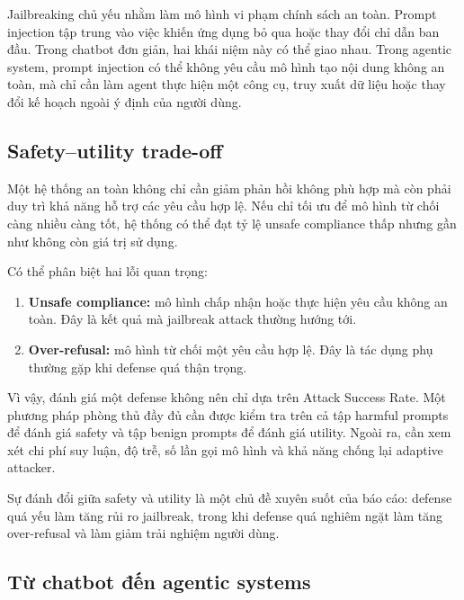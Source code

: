Jailbreaking chủ yếu nhằm làm mô hình vi phạm chính sách an toàn. Prompt
injection tập trung vào việc khiến ứng dụng bỏ qua hoặc thay đổi chỉ dẫn
ban đầu. Trong chatbot đơn giản, hai khái niệm này có thể giao nhau. Trong
agentic system, prompt injection có thể không yêu cầu mô hình tạo nội dung
không an toàn, mà chỉ cần làm agent thực hiện một công cụ, truy xuất dữ
liệu hoặc thay đổi kế hoạch ngoài ý định của người dùng.

\subsection{Safety--utility trade-off}
\label{subsec:safety-utility-tradeoff}

Một hệ thống an toàn không chỉ cần giảm phản hồi không phù hợp mà còn phải
duy trì khả năng hỗ trợ các yêu cầu hợp lệ. Nếu chỉ tối ưu để mô hình từ
chối càng nhiều càng tốt, hệ thống có thể đạt tỷ lệ unsafe compliance thấp
nhưng gần như không còn giá trị sử dụng.

Có thể phân biệt hai lỗi quan trọng:

\begin{enumerate}[leftmargin=1.2cm]
    \item \textbf{Unsafe compliance:}
    mô hình chấp nhận hoặc thực hiện yêu cầu không an toàn. Đây là kết quả
    mà jailbreak attack thường hướng tới.

    \item \textbf{Over-refusal:}
    mô hình từ chối một yêu cầu hợp lệ. Đây là tác dụng phụ thường gặp khi
    defense quá thận trọng.
\end{enumerate}

Vì vậy, đánh giá một defense không nên chỉ dựa trên Attack Success Rate.
Một phương pháp phòng thủ đầy đủ cần được kiểm tra trên cả tập harmful
prompts để đánh giá safety và tập benign prompts để đánh giá utility. Ngoài
ra, cần xem xét chi phí suy luận, độ trễ, số lần gọi mô hình và khả năng
chống lại adaptive attacker.

Sự đánh đổi giữa safety và utility là một chủ đề xuyên suốt của báo cáo:
defense quá yếu làm tăng rủi ro jailbreak, trong khi defense quá nghiêm
ngặt làm tăng over-refusal và làm giảm trải nghiệm người dùng.

\subsection{Từ chatbot đến agentic systems}
\label{subsec:from-chatbots-to-agents}

